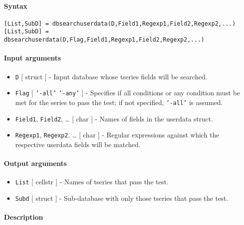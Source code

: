 


	\paragraph{Syntax}

\begin{verbatim}
[List,SubD] = dbsearchuserdata(D,Field1,Regexp1,Field2,Regexp2,...)
[List,SubD] = dbsearchuserdata(D,Flag,Field1,Regexp1,Field2,Regexp2,...)
\end{verbatim}

\paragraph{Input arguments}

\begin{itemize}
\item
  \texttt{D} {[} struct {]} - Input database whose tseries fields will
  be searched.
\item
  \texttt{Flag} {[} \texttt{'-all'} \textbar{} \texttt{'-any'} {]} -
  Specifies if all conditions or any condition must be met for the
  series to pass the test; if not specified, \texttt{'-all'} is assumed.
\item
  \texttt{Field1}, \texttt{Field2}, \ldots{} {[} char {]} - Names of
  fields in the userdata struct.
\item
  \texttt{Regexp1}, \texttt{Regexp2}, \ldots{} {[} char {]} - Regular
  expressions against which the respective userdata fields will be
  matched.
\end{itemize}

\paragraph{Output arguments}

\begin{itemize}
\item
  \texttt{List} {[} cellstr {]} - Names of tseries that pass the test.
\item
  \texttt{Subd} {[} struct {]} - Sub-database with only those tseries
  that pass the test.
\end{itemize}

\paragraph{Description}

